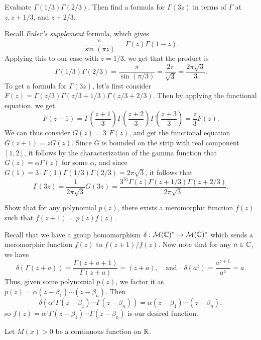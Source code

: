 \documentclass{pset}
\begin{document}
\begin{problem}{3.24}
  Evaluate $\Gamma(1/3)\Gamma(2/3)$. Then find a formula for $\Gamma(3z)$ in terms of $\Gamma$ at $z, z+1/3$, and $z+2/3$.
\end{problem}

\begin{solution}
  Recall \emph{Euler's supplement} formula, which gives 
  \[
    \frac{\pi}{\sin(\pi z)} = \Gamma(z)\Gamma(1-z).
  \]
  Applying this to our case with $z=1/3$, we get that the product is 
  \[
    \Gamma(1/3)\Gamma(2/3) = \frac{\pi}{\sin(\pi/3)} = \frac{2\pi}{\sqrt{3}} = \frac{2\pi\sqrt{3}}{3}.
  \]
  To get a formula for $\Gamma(3z)$, let's first consider $F(z)=\Gamma(z/3)\Gamma(z/3+1/3)\Gamma(z/3+2/3)$. Then by applying the functional equation, we get
  \[
    F(z+1) = \Gamma\left(\frac{z+1}{3}\right)\Gamma\left(\frac{z+2}{3}\right)\Gamma\left(\frac{z+3}{3}\right) = \frac{z}{3} F(z).
  \]
  We can thus consider $G(z)=3^zF(z)$, and get the functional equation $G(z+1)=zG(z)$. Since $G$ is bounded on the strip with real component $[1,2]$, it follows by the characterization of the gamma function that $G(z)=\alpha \Gamma(z)$ for some $\alpha$, and since $G(1)=3\cdot \Gamma(1)\Gamma(1/3)\Gamma(2/3) = 2\pi\sqrt{3}$, it follows that 
  \[
    \Gamma(3z)=\frac{1}{2\pi \sqrt{3}}G(3z) = \frac{3^{3z}\Gamma(z)\Gamma(z+1/3)\Gamma(z+2/3)}{2\pi \sqrt{3}}.
  \]
\end{solution}

\begin{problem}{3.26}
  Show that for any polynomial $p(z)$, there exists a meromorphic function $f(z)$ such that $f(z+1)=p(z)f(z)$.
\end{problem}

\begin{solution}
  Recall that we have a group homomorphism $\delta : \mathcal{M}(\mathbb{C})^* \to \mathcal{M}(\mathbb{C})^*$ which sends a meromorphic function $f(z)$ to $f(z+1)/f(z)$. Now note that for any $a\in \mathbb{C}$, we have
  \[
    \delta(\Gamma(z+a)) = \frac{\Gamma(z+a+1)}{\Gamma(z+a)} = (z+a), \quad\textrm{and}\quad \delta(a^z) = \frac{a^{z+1}}{a^z} = a.
  \]
  Thus, given some polynomial $p(z)$, we factor it as $p(z)=\alpha(z-\beta_1)\cdots(z-\beta_n)$. Then
  \[
    \delta(\alpha^z\Gamma(z-\beta_1)\cdots \Gamma(z-\beta_n)) = \alpha(z-\beta_1)\cdots(z-\beta_n),
  \]
  so $f(z) = \alpha^z\Gamma(z-\beta_1)\cdots \Gamma(z-\beta_n)$ is our desired function.
\end{solution}

\begin{problem}{3.33}
  Let $M(x) > 0$ be a continuous function on $\mathbb{R}$.
\end{problem}
\end{document}
